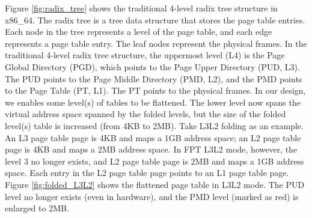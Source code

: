 Figure \ref{fig:radix_tree} shows the traditional 4-level radix tree structure in x86\_64. The radix tree is a tree data structure that stores the page table entries. Each node in the tree represents a level of the page table, and each edge represents a page table entry. The leaf nodes represent the physical frames. In the traditional 4-level radix tree structure, the uppermost level (L4) is the Page Global Directory (PGD), which points to the Page Upper Directory (PUD, L3). The PUD points to the Page Middle Directory (PMD, L2), and the PMD points to the Page Table (PT, L1). The PT points to the physical frames. In our design, we enables some level(s) of tables to be flattened. The lower level now spans the virtual address space spanned by the folded levels, but the size of the folded level(s) table is increased (from 4KB to 2MB). Take L3L2 folding as an example. An L3 page table page is 4KB and maps a 1GB address space; an L2 page table page is 4KB and maps a 2MB address space. In FPT L3L2 mode, however, the level 3 no longer exists, and L2 page table page is 2MB and maps a 1GB address space. Each entry in the L2 page table page points to an L1 page table page. Figure \ref{fig:folded_L3L2} shows the flattened page table in L3L2 mode. The PUD level no longer exists (even in hardware), and the PMD level (marked as red) is enlarged to 2MB.